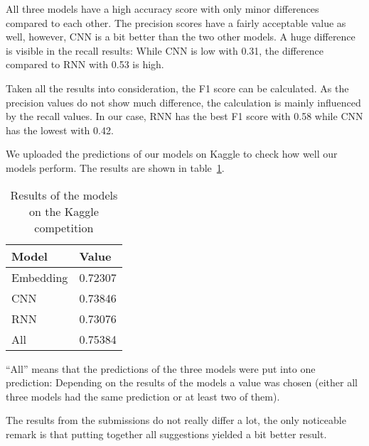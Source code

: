 \documentclass[runningheads]{llncs}
\begin{document}
All three models have a high accuracy score with only minor differences compared to each other.
The precision scores have a fairly acceptable value as well, however, CNN is a bit better than the two other models.
A huge difference is visible in the recall results: While CNN is low with 0.31, the difference compared to RNN with 0.53 is high.

Taken all the results into consideration, the F1 score can be calculated. As the precision values do not show much difference, the calculation is mainly influenced by the recall values. In our case, RNN has the best F1 score with 0.58 while CNN has the lowest with 0.42.

We uploaded the predictions of our models on Kaggle \cite{ref_kaggle} to check how well our models perform. The results are shown in table~\ref{tab:kaggle-table}.

\begin{table}[]
\centering
\begin{tabular}{|l|l|}
\hline
\rowcolor[HTML]{C0C0C0} 
\textbf{Model} & \textbf{Value} \\ \hline
Embedding & 0.72307 \\ \hline
CNN & 0.73846 \\ \hline
RNN & 0.73076 \\ \hline
All & 0.75384 \\ \hline
\end{tabular}
\caption{Results of the models on the Kaggle competition}
\label{tab:kaggle-table}
\end{table}

``All'' means that the predictions of the three models were put into one prediction: Depending on the results of the models a value was chosen (either all three models had the same prediction or at least two of them).

The results from the submissions do not really differ a lot, the only noticeable remark is that putting together all suggestions yielded a bit better result.
\end{document}
